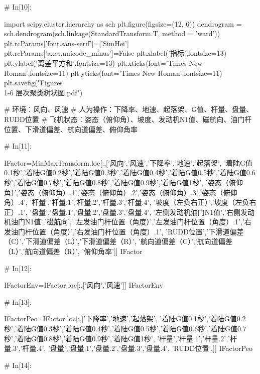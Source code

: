 \documentclass{MathorCupModeling}
\begin{document}
\begin{python}
# In[10]:


import scipy.cluster.hierarchy as sch
plt.figure(figsize=(12, 6))
dendrogram = sch.dendrogram(sch.linkage(StandardTransform.T, method = 'ward'))
plt.rcParams['font.sans-serif']=['SimHei']
plt.rcParams['axes.unicode_minus']=False
plt.xlabel('指标',fontsize=13)
plt.ylabel('离差平方和',fontsize=13)
plt.xticks(font='Times New Roman',fontsize=11)
plt.yticks(font='Times New Roman',fontsize=11)
plt.savefig("Figures\\1-6 层次聚类树状图.pdf")


# 环境：风向、风速
# 人为操作：下降率、地速、起落架、G值、杆量、盘量、RUDD位置
# 飞机状态：姿态（俯仰角）、坡度、发动机N1值、磁航向、油门杆位置、下滑道偏差、航向道偏差、俯仰角率

# In[11]:


IFactor=MinMaxTransform.loc[:,['风向','风速','下降率','地速','起落架',
                               '着陆G值0.1秒','着陆G值0.2秒','着陆G值0.3秒','着陆G值0.4秒','着陆G值0.5秒','着陆G值0.6秒','着陆G值0.7秒','着陆G值0.8秒','着陆G值0.9秒','着陆G值1秒',
                               '姿态（俯仰角）','姿态（俯仰角）.1','姿态（俯仰角）.2','姿态（俯仰角）.3','姿态（俯仰角）.4',
                               '杆量','杆量.1','杆量.2','杆量.3','杆量.4',
                               '坡度（左负右正）','坡度（左负右正）.1',
                               '盘量','盘量.1','盘量.2','盘量.3','盘量.4',
                               '左侧发动机油门N1值','右侧发动机油门N1值','磁航向',
                               '左发油门杆位置（角度）','左发油门杆位置（角度）.1','右发油门杆位置（角度）','右发油门杆位置（角度）.1',
                               'RUDD位置','下滑道偏差（C）','下滑道偏差（L）','下滑道偏差（R）',
                               '航向道偏差（C）','航向道偏差（L）','航向道偏差（R）',
                               '俯仰角率']]
IFactor


# In[12]:


IFactorEnv=IFactor.loc[:,['风向','风速']]
IFactorEnv


# In[13]:


IFactorPeo=IFactor.loc[:,['下降率','地速','起落架',
                          '着陆G值0.1秒','着陆G值0.2秒','着陆G值0.3秒','着陆G值0.4秒','着陆G值0.5秒','着陆G值0.6秒','着陆G值0.7秒','着陆G值0.8秒','着陆G值0.9秒','着陆G值1秒',
                          '杆量','杆量.1','杆量.2','杆量.3','杆量.4',
                          '盘量','盘量.1','盘量.2','盘量.3','盘量.4',
                          'RUDD位置',]]
IFactorPeo


# In[14]:



\end{python}
\end{document}
